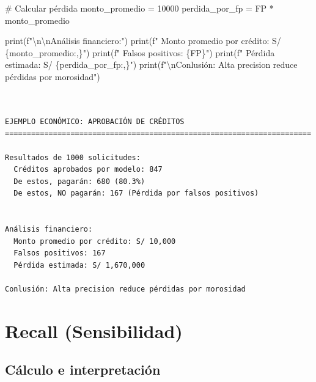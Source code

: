\documentclass[
  doc,
  floatsintext,
  longtable,
  a4paper,
  nolmodern,
  notxfonts,
  notimes,
  12pt,
  colorlinks=true,linkcolor=blue,citecolor=blue,urlcolor=blue]{apa7}
\newenvironment{Shaded}{\begin{snugshade}}{\end{snugshade}}
\newcommand{\BuiltInTok}[1]{\textcolor[rgb]{0.00,0.23,0.31}{#1}}
\newcommand{\CharTok}[1]{\textcolor[rgb]{0.13,0.47,0.30}{#1}}
\newcommand{\CommentTok}[1]{\textcolor[rgb]{0.37,0.37,0.37}{#1}}
\newcommand{\DecValTok}[1]{\textcolor[rgb]{0.68,0.00,0.00}{#1}}
\newcommand{\NormalTok}[1]{\textcolor[rgb]{0.00,0.23,0.31}{#1}}
\newcommand{\OperatorTok}[1]{\textcolor[rgb]{0.37,0.37,0.37}{#1}}
\newcommand{\SpecialCharTok}[1]{\textcolor[rgb]{0.37,0.37,0.37}{#1}}
\newcommand{\SpecialStringTok}[1]{\textcolor[rgb]{0.13,0.47,0.30}{#1}}
\begin{document}
\begin{Shaded}
\begin{Highlighting}[]
\CommentTok{\# Calcular pérdida}
\NormalTok{monto\_promedio }\OperatorTok{=} \DecValTok{10000}
\NormalTok{perdida\_por\_fp }\OperatorTok{=}\NormalTok{ FP }\OperatorTok{*}\NormalTok{ monto\_promedio}

\BuiltInTok{print}\NormalTok{(}\SpecialStringTok{f"}\CharTok{\textbackslash{}n\textbackslash{}n}\SpecialStringTok{Análisis financiero:"}\NormalTok{)}
\BuiltInTok{print}\NormalTok{(}\SpecialStringTok{f"  Monto promedio por crédito: S/ }\SpecialCharTok{\{}\NormalTok{monto\_promedio}\SpecialCharTok{:,\}}\SpecialStringTok{"}\NormalTok{)}
\BuiltInTok{print}\NormalTok{(}\SpecialStringTok{f"  Falsos positivos: }\SpecialCharTok{\{}\NormalTok{FP}\SpecialCharTok{\}}\SpecialStringTok{"}\NormalTok{)}
\BuiltInTok{print}\NormalTok{(}\SpecialStringTok{f"  Pérdida estimada: S/ }\SpecialCharTok{\{}\NormalTok{perdida\_por\_fp}\SpecialCharTok{:,\}}\SpecialStringTok{"}\NormalTok{)}
\BuiltInTok{print}\NormalTok{(}\SpecialStringTok{f"}\CharTok{\textbackslash{}n}\SpecialStringTok{Conlusión: Alta precision reduce pérdidas por morosidad"}\NormalTok{)}
\end{Highlighting}
\end{Shaded}

\begin{verbatim}


EJEMPLO ECONÓMICO: APROBACIÓN DE CRÉDITOS
======================================================================

Resultados de 1000 solicitudes:
  Créditos aprobados por modelo: 847
  De estos, pagarán: 680 (80.3%)
  De estos, NO pagarán: 167 (Pérdida por falsos positivos)


Análisis financiero:
  Monto promedio por crédito: S/ 10,000
  Falsos positivos: 167
  Pérdida estimada: S/ 1,670,000

Conlusión: Alta precision reduce pérdidas por morosidad
\end{verbatim}

\section{Recall (Sensibilidad)}\label{recall-sensibilidad}

\subsection{Cálculo e
interpretación}\label{cuxe1lculo-e-interpretaciuxf3n-2}
\end{document}
